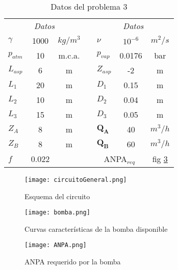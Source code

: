 \begin{itemize}
\begin{table}[!h]
  \centering
  \begin{tabular}{|l|c|c|p{2cm}|l|c|c|}
    \cline{1-3} \cline{5-7}
    \multicolumn{3}{|c|}{\textit{Datos}} && \multicolumn{3}{|c|}{\textit{Datos}} \\
    \cline{1-3} \cline{5-7}
    $\gamma$ & 1000 & $kg/m^3$ && $\nu$ & $10^{-6}$& $m^2/s$ \\
    \cline{1-3} \cline{5-7} 
    $p_{atm}$ & 10 & m.c.a. &&  $p_{vap}$ & 0.0176& bar \\ 
    \cline{1-3} \cline{5-7}
    $L_{asp}$ & 6 & m && $Z_{asp}$ & -2 & m \\
    \cline{1-3} \cline{5-7} 
    $L_1$ & 20 & m && $D_1$ & 0.15 & m \\ 
    \cline{1-3} \cline{5-7} 
    $L_2$ & 10 & m && $D_2$ & 0.04 & m \\ 
    \cline{1-3} \cline{5-7} 
    $L_3$ & 15 & m && $D_3$ & 0.05 & m \\ 
    \cline{1-3} \cline{5-7}
    $Z_A$ & 8 & m && $\mathbf{Q_A}$ & 40 & $m^3/h$ \\ 
    \cline{1-3} \cline{5-7}
    $Z_B$ & 8 & m && $\mathbf{Q_B}$ & 60 & $m^3/h$ \\ 
    \cline{1-3} \cline{5-7}
    $f$ & 0.022 &  && \multicolumn{2}{c|}{ANPA$_{req}$} & fig \ref{fig:ANPA}\\ 
    \cline{1-3} \cline{5-7} 
  \end{tabular}  
  \caption{Datos del problema 3}
  \label{tab:circuito}
  \end{table}

\begin{figure}[hb]
\centering
\texttt{[image: circuitoGeneral.png]}
\caption{Esquema del circuito}
\label{fig:circuito_gen}
\end{figure}


\begin{figure}[hb]
\centering
\texttt{[image: bomba.png]}
\caption{Curvas características de la bomba disponible}
\label{fig:bomba}
\end{figure}

\begin{figure}[hb]
\centering
\texttt{[image: ANPA.png]}
\caption{ANPA requerido por la bomba}
\label{fig:ANPA}
\end{figure}


\end{itemize}
